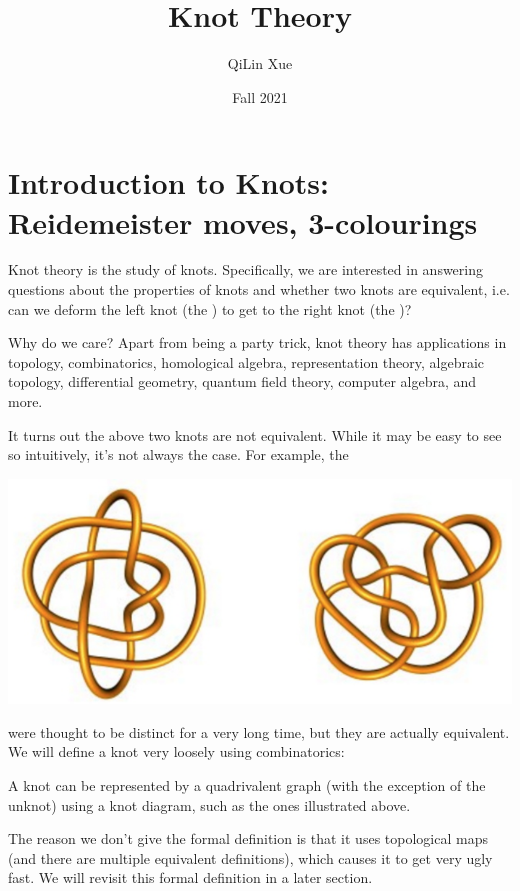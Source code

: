 \documentclass{article}
\title{Knot Theory}
\author{QiLin Xue}
\date{Fall 2021}
\begin{document}
\maketitle
\tableofcontents

\newpage
\section{Introduction to Knots: Reidemeister moves, 3-colourings}
Knot theory is the study of knots. Specifically, we are interested in answering questions about the properties of knots and whether two knots are equivalent, i.e. can we deform the left knot (the ) to get to the right knot (the )?
\begin{center}
    \hspace{-10mm}
\end{center}\vspace{-6mm}
Why do we care? Apart from being a party trick, knot theory has applications in topology, combinatorics, homological algebra, representation theory, algebraic topology, differential geometry, quantum field theory, computer algebra, and more.

It turns out the above two knots are not equivalent. While it may be easy to see so intuitively, it's not always the case. For example, the 
\begin{center}
    \includegraphics[width=0.3\linewidth]{figures/perko.png}
\end{center}
were thought to be distinct for a very long time, but they are actually equivalent. We will define a knot very loosely using combinatorics:
\begin{definition}
    A knot can be represented by a quadrivalent graph (with the exception of the unknot) using a knot diagram, such as the ones illustrated above. 
\end{definition}
The reason we don't give the formal definition is that it uses topological maps (and there are multiple equivalent definitions), which causes it to get very ugly fast. We will revisit this formal definition in a later section.
\end{document}
